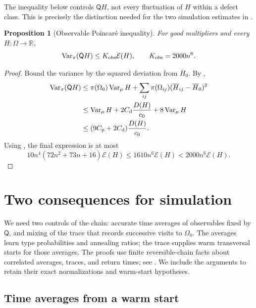 \documentclass[11pt]{article}
\newtheorem{proposition}[theorem]{Proposition}
\theoremstyle{definition}
\newcommand{\R}{\mathbb R}
\newcommand{\Var}{\operatorname{Var}}
\newcommand{\calE}{\mathcal E}
\newcommand{\Om}{\Omega}
\newcommand{\Qproj}{\mathsf Q}
\begin{document}
The inequality below controls $\Qproj H$, not every fluctuation of
$H$ within a defect class.  This is precisely the distinction needed
for the two simulation estimates in .

\begin{proposition}[Observable Poincar\'e inequality]\label{prop:observable}
For good multipliers and every $H:\Om\to\R$,
\begin{equation}\label{eq:observable}
 \Var_\pi(\Qproj H)\le K_{\rm obs}\calE(H),
 \qquad K_{\rm obs}=2000n^6.
\end{equation}
\end{proposition}

\begin{proof}
Bound the variance by the squared deviation from $\overline H_0$.
By ,
\begin{align*}
 \Var_\pi(\Qproj H)
 &\le \pi(\Om_0)\Var_\mu H
       +\sum_{ij}\pi(\Om_{ij})(\overline H_{ij}-\overline H_0)^2\\
 &\le \Var_\mu H+2C_{\rm d}\frac{D(H)}{c_0}+8\Var_\mu H\\
 &\le (9C_{\rm p}+2C_{\rm d})\frac{D(H)}{c_0}.
\end{align*}
Using , the final expression is at most
\[
 10n^4(72n^2+73n+16)\calE(H)
 \le1610n^6\calE(H)<2000n^6\calE(H).
\]
\end{proof}

\section{Two consequences for simulation}\label{sec:probability}

We need two controls of the chain: accurate time averages of observables
fixed by $\Qproj$, and mixing of the trace that records successive visits
to $\Om_0$.  The averages learn type probabilities and annealing ratios;
the trace supplies warm transversal starts for those averages.
The proofs use finite reversible-chain facts about correlated averages,
traces, and return times; see \cite[Sections~2.7.1 and~4.4.1,
Corollary~2.24]{AldousFill2002}.  We include the arguments to retain
their exact normalizations and warm-start hypotheses.

\subsection{Time averages from a warm start}
\end{document}
